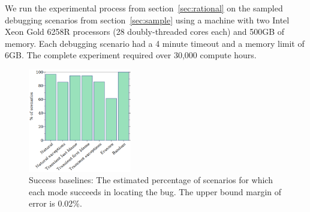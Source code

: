 
We run the experimental process from section~\ref{sec:rational} on the
sampled debugging scenarios from section~\ref{sec:sample} using a machine with two Intel Xeon Gold 6258R processors (28 doubly-threaded cores each) and 500GB of memory.
Each debugging scenario had a 4 minute timeout and a
memory limit of 6GB. The complete experiment required
over 30,000 compute hours.


\begin{figure}
  \centering
  \includegraphics[width=0.40\textwidth]{./plots/success-bars}
  \caption{Success baselines: The estimated percentage of scenarios for which each mode succeeds in locating the bug.
  The upper bound margin of error is 0.02\%.
  }
  \label{fig:success-bars}
\end{figure}

